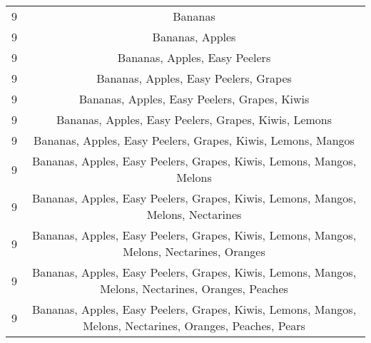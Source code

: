 \documentclass[11pt]{article}
\begin{document}
\begin{table}[h]
\begin{center}
\begin{tabular}{lc}
9 & Bananas \\
9 & Bananas, Apples \\
9 & Bananas, Apples, Easy Peelers \\
9 & Bananas, Apples, Easy Peelers, Grapes \\
9 & Bananas, Apples, Easy Peelers, Grapes, Kiwis \\
9 & Bananas, Apples, Easy Peelers, Grapes, Kiwis, Lemons \\
9 & Bananas, Apples, Easy Peelers, Grapes, Kiwis, Lemons, Mangos \\
9 & Bananas, Apples, Easy Peelers, Grapes, Kiwis, Lemons, Mangos, Melons \\
9 & Bananas, Apples, Easy Peelers, Grapes, Kiwis, Lemons, Mangos, Melons, Nectarines \\
9 & Bananas, Apples, Easy Peelers, Grapes, Kiwis, Lemons, Mangos, Melons, Nectarines, Oranges \\
9 & Bananas, Apples, Easy Peelers, Grapes, Kiwis, Lemons, Mangos, Melons, Nectarines, Oranges, Peaches \\
9 & Bananas, Apples, Easy Peelers, Grapes, Kiwis, Lemons, Mangos, Melons, Nectarines, Oranges, Peaches, Pears \\
\hline \hline
\end{tabular}
\end{center}
\end{table}
\end{document}

